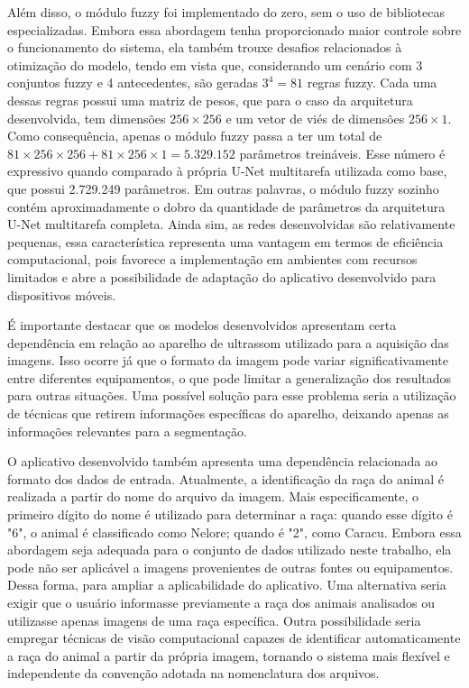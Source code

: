 Além disso, o módulo fuzzy foi implementado do zero, sem o uso de bibliotecas especializadas. Embora essa abordagem tenha proporcionado maior controle sobre o funcionamento do sistema, ela também trouxe desafios relacionados à otimização do modelo, tendo em vista que, considerando um cenário com 3 conjuntos fuzzy e 4 antecedentes, são geradas $3^4 = 81$ regras fuzzy. Cada uma dessas regras possui uma matriz de pesos, que para o caso da arquitetura desenvolvida, tem dimensões $256 \times 256$ e um vetor de viés de dimensões $256 \times 1$. Como consequência, apenas o módulo fuzzy passa a ter um total de $81 \times 256 \times 256 + 81 \times 256 \times 1 = 5.329.152$ parâmetros treináveis. Esse número é expressivo quando comparado à própria U-Net multitarefa utilizada como base, que possui 2.729.249 parâmetros. Em outras palavras, o módulo fuzzy sozinho contém aproximadamente o dobro da quantidade de parâmetros da arquitetura U-Net multitarefa completa. Ainda sim, as redes desenvolvidas são relativamente pequenas, essa característica representa uma vantagem em termos de eficiência computacional, pois favorece a implementação em ambientes com recursos limitados e abre a possibilidade de adaptação do aplicativo desenvolvido para dispositivos móveis.

É importante destacar que os modelos desenvolvidos apresentam certa dependência em relação ao aparelho de ultrassom utilizado para a aquisição das imagens. Isso ocorre já que o formato da imagem pode variar significativamente entre diferentes equipamentos, o que pode limitar a generalização dos resultados para outras situações. Uma possível solução para esse problema seria a utilização de técnicas que retirem informações específicas do aparelho, deixando apenas as informações relevantes para a segmentação. 

O aplicativo desenvolvido também apresenta uma dependência relacionada ao formato dos dados de entrada. Atualmente, a identificação da raça do animal é realizada a partir do nome do arquivo da imagem. Mais especificamente, o primeiro dígito do nome é utilizado para determinar a raça: quando esse dígito é "6", o animal é classificado como Nelore; quando é "2", como Caracu. Embora essa abordagem seja adequada para o conjunto de dados utilizado neste trabalho, ela pode não ser aplicável a imagens provenientes de outras fontes ou equipamentos. Dessa forma, para ampliar a aplicabilidade do aplicativo. Uma alternativa seria exigir que o usuário informasse previamente a raça dos animais analisados ou utilizasse apenas imagens de uma raça específica. Outra possibilidade seria empregar técnicas de visão computacional capazes de identificar automaticamente a raça do animal a partir da própria imagem, tornando o sistema mais flexível e independente da convenção adotada na nomenclatura dos arquivos.

